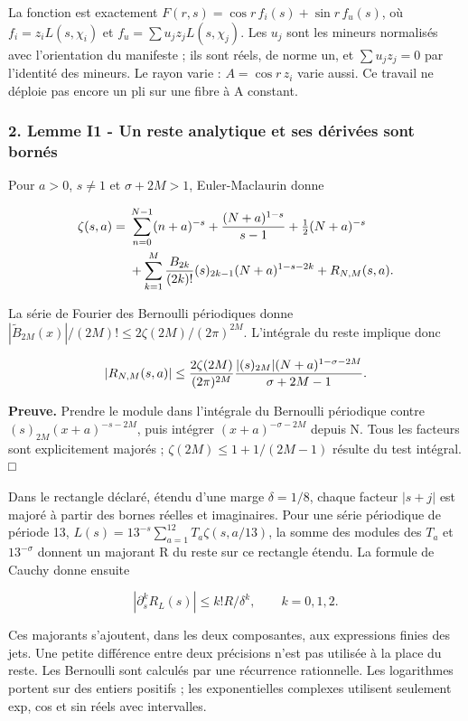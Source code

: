 \documentclass[
  10pt,
  a4paper,
]{article}
\begin{document}
La fonction est exactement \(F(r,s)=\cos r\,f_i(s)+\sin r\,f_u(s)\), où
\(f_i=z_iL(s,\chi_i)\) et \(f_u=\sum u_jz_jL(s,\chi_j)\). Les \(u_j\)
sont les mineurs normalisés avec l'orientation du manifeste ; ils sont
réels, de norme un, et \(\sum u_jz_j=0\) par l'identité des mineurs. Le
rayon varie : \(A=\cos r\,z_i\) varie aussi. Ce travail ne déploie pas
encore un pli sur une fibre à A constant.

\hypertarget{lemme-i1---un-reste-analytique-et-ses-duxe9rivuxe9es-sont-bornuxe9s}{%
\subsubsection{2. Lemme I1 - Un reste analytique et ses dérivées sont
bornés}\label{lemme-i1---un-reste-analytique-et-ses-duxe9rivuxe9es-sont-bornuxe9s}}

Pour \(a>0\), \(s\ne1\) et \(\sigma+2M>1\), Euler-Maclaurin donne

\[
\begin{aligned}
\zeta(s,a)={}&\sum_{n=0}^{N-1}(n+a)^{-s}
+{(N+a)^{1-s}\over s-1}+\tfrac12(N+a)^{-s}\\
&+\sum_{k=1}^M {B_{2k}\over(2k)!}(s)_{2k-1}(N+a)^{1-s-2k}
+R_{N,M}(s,a).
\end{aligned}
\]

La série de Fourier des Bernoulli périodiques donne
\(|\widetilde B_{2M}(x)|/(2M)!\le2\zeta(2M)/(2\pi)^{2M}\). L'intégrale
du reste implique donc

\[
|R_{N,M}(s,a)|\le
{2\zeta(2M)\over(2\pi)^{2M}}
{|(s)_{2M}|(N+a)^{1-\sigma-2M}\over\sigma+2M-1}.
\]

\textbf{Preuve.} Prendre le module dans l'intégrale du Bernoulli
périodique contre \((s)_{2M}(x+a)^{-s-2M}\), puis intégrer
\((x+a)^{-\sigma-2M}\) depuis N. Tous les facteurs sont explicitement
majorés ; \(\zeta(2M)\le1+1/(2M-1)\) résulte du test intégral. □

Dans le rectangle déclaré, étendu d'une marge \(\delta=1/8\), chaque
facteur \(|s+j|\) est majoré à partir des bornes réelles et imaginaires.
Pour une série périodique de période 13,
\(L(s)=13^{-s}\sum_{a=1}^{12}T_a\zeta(s,a/13)\), la somme des modules
des \(T_a\) et \(13^{-\sigma}\) donnent un majorant R du reste sur ce
rectangle étendu. La formule de Cauchy donne ensuite

\[
|\partial_s^k R_L(s)|\le k!R/\delta^k,\qquad k=0,1,2.
\]

Ces majorants s'ajoutent, dans les deux composantes, aux expressions
finies des jets. Une petite différence entre deux précisions n'est pas
utilisée à la place du reste. Les Bernoulli sont calculés par une
récurrence rationnelle. Les logarithmes portent sur des entiers positifs
; les exponentielles complexes utilisent seulement exp, cos et sin réels
avec intervalles.
\end{document}
